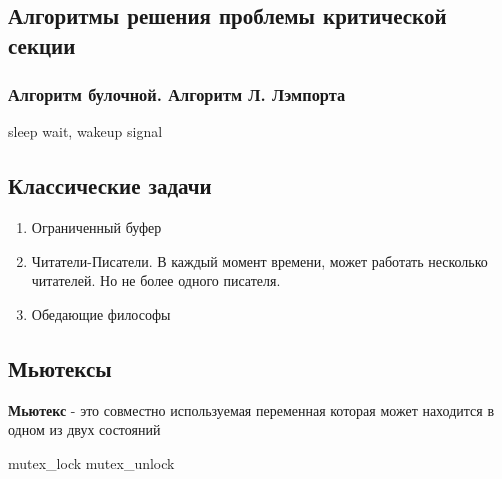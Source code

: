 \documentclass[a4paper]{article}
\begin{document}
\subsection{Алгоритмы решения проблемы критической секции}

\subsubsection{Алгоритм булочной. Алгоритм Л. Лэмпорта}
sleep wait, wakeup signal

\subsection{Классические задачи}
\begin{enumerate}
    \item Ограниченный буфер
    \item Читатели-Писатели. В каждый момент времени, может работать несколько читателей. Но не более одного писателя.
    \item Обедающие философы
\end{enumerate}


\subsection{Мьютексы}
\textbf{Мьютекс} - это совместно используемая переменная которая может находится в одном из двух состояний

mutex_lock
mutex_unlock
\end{document}
